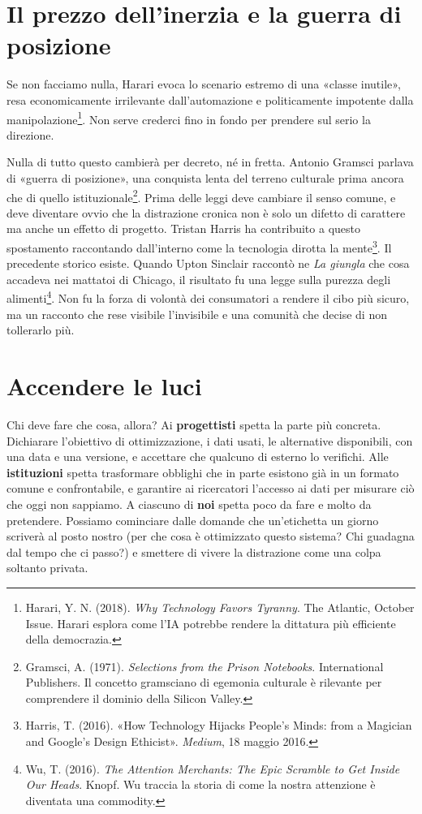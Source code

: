 \section{Il prezzo dell'inerzia e la guerra di posizione}
\label{sec:p4c31-se-non-facciamo}
Se non facciamo nulla, Harari evoca lo scenario estremo di una «classe inutile», resa economicamente irrilevante dall'automazione e politicamente impotente dalla manipolazione\footnote{Harari, Y. N. (2018). \textit{Why Technology Favors Tyranny}. The Atlantic, October Issue. Harari esplora come l'IA potrebbe rendere la dittatura più efficiente della democrazia.}. Non serve crederci fino in fondo per prendere sul serio la direzione.

\label{sec:p4c31-una-lenta-guerra}
Nulla di tutto questo cambierà per decreto, né in fretta. Antonio Gramsci parlava di «guerra di posizione», una conquista lenta del terreno culturale prima ancora che di quello istituzionale\footnote{Gramsci, A. (1971). \textit{Selections from the Prison Notebooks}. International Publishers. Il concetto gramsciano di egemonia culturale è rilevante per comprendere il dominio della Silicon Valley.}. Prima delle leggi deve cambiare il senso comune, e deve diventare ovvio che la distrazione cronica non è solo un difetto di carattere ma anche un effetto di progetto. Tristan Harris ha contribuito a questo spostamento raccontando dall'interno come la tecnologia dirotta la mente\footnote{Harris, T. (2016). «How Technology Hijacks People's Minds: from a Magician and Google's Design Ethicist». \textit{Medium}, 18 maggio 2016.}. Il precedente storico esiste. Quando Upton Sinclair raccontò ne \textit{La giungla} che cosa accadeva nei mattatoi di Chicago, il risultato fu una legge sulla purezza degli alimenti\footnote{Wu, T. (2016). \textit{The Attention Merchants: The Epic Scramble to Get Inside Our Heads}. Knopf. Wu traccia la storia di come la nostra attenzione è diventata una commodity.}. Non fu la forza di volontà dei consumatori a rendere il cibo più sicuro, ma un racconto che rese visibile l'invisibile e una comunità che decise di non tollerarlo più.

\section{Accendere le luci}
\label{sec:p4c31-accendere-le-luci}
Chi deve fare che cosa, allora? Ai \textbf{progettisti} spetta la parte più concreta. Dichiarare l'obiettivo di ottimizzazione, i dati usati, le alternative disponibili, con una data e una versione, e accettare che qualcuno di esterno lo verifichi. Alle \textbf{istituzioni} spetta trasformare obblighi che in parte esistono già in un formato comune e confrontabile, e garantire ai ricercatori l'accesso ai dati per misurare ciò che oggi non sappiamo. A ciascuno di \textbf{noi} spetta poco da fare e molto da pretendere. Possiamo cominciare dalle domande che un'etichetta un giorno scriverà al posto nostro (per che cosa è ottimizzato questo sistema? Chi guadagna dal tempo che ci passo?) e smettere di vivere la distrazione come una colpa soltanto privata.

